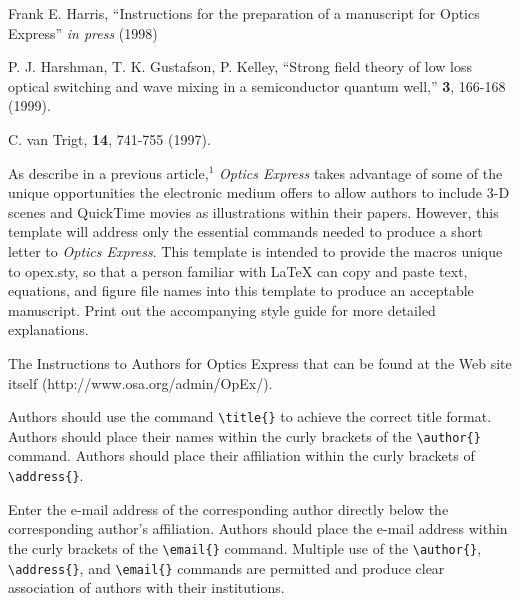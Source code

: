 %
%
\begin{OEReferences}
\item  Frank E. Harris, ``Instructions 
for the preparation of a manuscript for Optics Express''
{\it in press} (1998)
\item  P. J. Harshman,  T. K. Gustafson, P. Kelley,
 ``Strong field theory of low loss optical switching and
  wave mixing in a semiconductor quantum well,''  \opex 
  {\bf 3}, 166-168  (1999).
\item  C. van Trigt,  \josaa
 {\bf 14}, 741-755 (1997).
\end{OEReferences}

\noindent
As describe in a previous article,$^1$
{\it Optics Express} takes advantage of 
some of the unique opportunities the electronic 
medium offers to allow authors to include 
3-D scenes and QuickTime movies 
as illustrations within their papers.  
However, this template will address
only the essential commands needed to produce a 
short letter to  {\it Optics Express}.
This template is intended to provide the macros 
unique to opex.sty, so that a person familiar
with LaTeX can copy and paste text, equations, 
and figure file names into this template to
produce an acceptable manuscript. Print out the
accompanying style guide for more detailed  
explanations.

The Instructions to 
Authors for Optics Express that can be found at the 
Web site itself (http://www.osa.org/admin/OpEx/). 

Authors should use the command 
\verb+\title{}+  to achieve the correct 
title format.  Authors should
place their names within the curly brackets of the 
\verb+\author{}+ command.  Authors should place 
their affiliation within the curly brackets of \\ 
\verb+\address{}+.


Enter the e-mail address of the corresponding author 
directly below the corresponding author's affiliation.  
Authors should place the 
e-mail address within the curly brackets of the 
\verb+\email{}+ command.
Multiple use of the \verb+\author{}+, 
\verb+\address{}+, and \verb+\email{}+ commands 
are permitted and produce clear association of authors
with their institutions.

